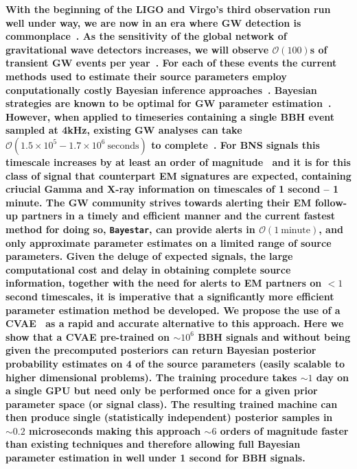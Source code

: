 \documentclass[%
showpacs,
 amsmath,amssymb,
 aps,
 twocolumn,
 prl,
 reprint,
floatfix,
]{revtex4-1}
\begin{document}
%
%
%
\textbf{ 
%
%
With the beginning of the \ac{LIGO} and Virgo's third observation run well
under way, we are now in an era where \ac{GW} detection is
commonplace~\cite{PhysRevLett.116.061102,
PhysRevX.6.041015,PhysRevLett.119.161101}. As the sensitivity of the global
network of gravitational wave detectors increases, we will observe
$\mathcal{O}(100)$s of transient \ac{GW} events per year~\cite{1409.7215}. For
each of these events the current methods used to estimate their source
parameters employ conputationally costly Bayesian inference
approaches~\cite{1409.7215}.
%
%
Bayesian strategies are known to be optimal for \ac{GW} parameter
estimation~\cite{Searle_paper}. However, when applied to timeseries containing
a single \ac{BBH} event sampled at 4kHz, existing \ac{GW} analyses can take
$\mathcal{O}(1.5\times 10^{5} - 1.7\times 10^{6}\:\textrm{seconds})$ to
complete~\cite{1409.7215}. For \ac{BNS} signals this timescale increases by at
least an order of magnitude~\cite{BNS_paper?} and it is for this class of
signal that counterpart \ac{EM} signatures are expected, containing criucial
Gamma and X-ray information on timescales of 1 second -- 1 minute. The \ac{GW}
community strives towards alerting their \ac{EM} follow-up partners in a timely
and efficient manner and the current fastest method for doing so,
\texttt{Bayestar}, can provide alerts in $\mathcal{O}(1\: \textrm{minute})$,
and only approximate parameter estimates on a limited range of source
parameters. Given the deluge of expected signals, the large computational cost
and delay in obtaining complete source information, together with the need for
alerts to \ac{EM} partners on $<1$ second timescales, it is imperative that a
significantly more efficient parameter estimation method be developed. We
propose the use of a \ac{CVAE}~\cite{1904.06264,1812.04405} as a rapid and
accurate alternative to this approach. 
%
%
Here we show that a \ac{CVAE} pre-trained on $\sim 10^{6}$ \ac{BBH} signals and
without being given the precomputed posteriors can return Bayesian posterior
probability estimates on 4 of the source parameters (easily scalable to higher
dimensional problems). The training procedure takes $\sim 1$ day on a single
\ac{GPU} but need only be performed once for a given prior parameter space (or
signal class). The resulting trained machine can then produce single
(statistically independent) posterior samples in $\sim 0.2$ microseconds making
this approach $\sim 6$ orders of magnitude faster than existing techniques and
therefore allowing full Bayesian parameter estimation in well under 1 second
for \ac{BBH} signals.}
\end{document}
